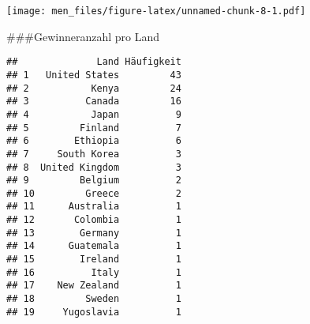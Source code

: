 \documentclass[
]{article}
\newenvironment{Shaded}{\begin{snugshade}}{\end{snugshade}}
\newcommand{\AttributeTok}[1]{\textcolor[rgb]{0.77,0.63,0.00}{#1}}
\newcommand{\ConstantTok}[1]{\textcolor[rgb]{0.00,0.00,0.00}{#1}}
\newcommand{\FunctionTok}[1]{\textcolor[rgb]{0.00,0.00,0.00}{#1}}
\newcommand{\NormalTok}[1]{#1}
\newcommand{\OtherTok}[1]{\textcolor[rgb]{0.56,0.35,0.01}{#1}}
\newcommand{\SpecialCharTok}[1]{\textcolor[rgb]{0.00,0.00,0.00}{#1}}
\newcommand{\StringTok}[1]{\textcolor[rgb]{0.31,0.60,0.02}{#1}}
\begin{document}
\texttt{[image: men\_files/figure-latex/unnamed-chunk-8-1.pdf]}

\#\#\#Gewinneranzahl pro Land

\begin{Shaded}
\end{Shaded}

\begin{verbatim}
##              Land Häufigkeit
## 1   United States         43
## 2           Kenya         24
## 3          Canada         16
## 4           Japan          9
## 5         Finland          7
## 6        Ethiopia          6
## 7     South Korea          3
## 8  United Kingdom          3
## 9         Belgium          2
## 10         Greece          2
## 11      Australia          1
## 12       Colombia          1
## 13        Germany          1
## 14      Guatemala          1
## 15        Ireland          1
## 16          Italy          1
## 17    New Zealand          1
## 18         Sweden          1
## 19     Yugoslavia          1
\end{verbatim}
\end{document}
